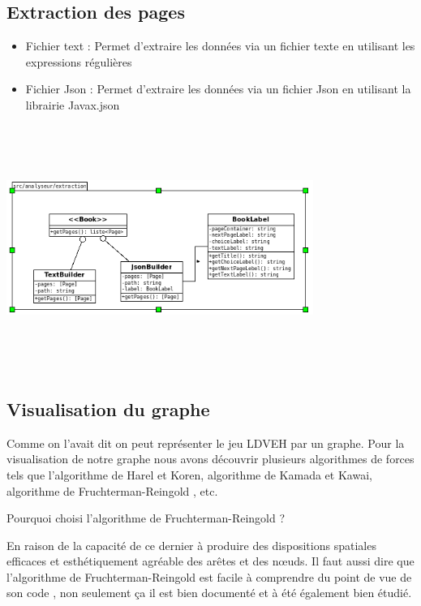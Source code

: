 \documentclass[12pt]{article}
\begin{document}
 \subsection{Extraction des pages}
 \begin{itemize}
 \item Fichier text :
 Permet d'extraire les données via un fichier texte en utilisant les expressions régulières
 \item Fichier Json :
 Permet d'extraire les données via un fichier Json en utilisant la librairie Javax.json
 
 \end{itemize}
 
 \includegraphics[width=10cm,height=8cm]{images/extraction.png} 	

 
 \subsection{Visualisation du graphe}

   Comme on l'avait dit on peut représenter le jeu LDVEH par un graphe. Pour la visualisation de notre graphe nous avons découvrir plusieurs algorithmes de forces tels que l'algorithme de Harel et Koren, algorithme de Kamada et Kawai, algorithme de Fruchterman-Reingold , etc.
   
\vspace{12pt plus 5pt minus 5pt}

Pourquoi choisi l'algorithme de Fruchterman-Reingold ? \newline

   En raison de la capacité de ce dernier à produire des dispositions spatiales efficaces et esthétiquement agréable des arêtes et des nœuds. Il faut aussi dire que l'algorithme de Fruchterman-Reingold  est facile à comprendre du point de vue de son code , non seulement ça il est bien documenté et à été également bien étudié. 
\vspace{12pt plus 5pt minus 5pt}
\end{document}
